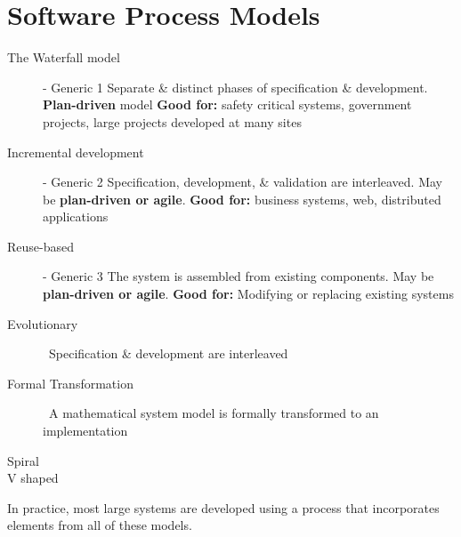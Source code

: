 \documentclass{report}
\begin{document}
\section{Software Process Models}
\begin{description}
  \item [The Waterfall model] - Generic 1 \newline Separate \& distinct phases of specification \& development.  \textbf{Plan-driven} model\newline
  \textbf{Good for:} safety critical systems, government projects, large projects developed at many sites
  \item [Incremental development] - Generic 2 \newline Specification, development, \& validation are interleaved. May be \textbf{plan-driven or agile}.\newline
  \textbf{Good for:} business systems, web, distributed applications
  \item [Reuse-based] - Generic 3 \newline The system is assembled from existing components. May be \textbf{plan-driven or agile}.\newline
  \textbf{Good for:} Modifying or replacing existing systems
  \item [Evolutionary] \ \newline Specification \& development are interleaved
  \item [Formal Transformation] \ \newline A mathematical system model is formally transformed to an implementation
  \item [Spiral]
  \item [V shaped]
\end{description}
In practice, most large systems are developed using a process that incorporates elements from all of these models.

\newpage
\end{document}
